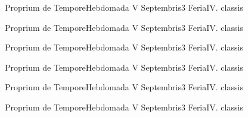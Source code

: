 \documentclass[liber-responsorialis_temporale.tex]{subfiles}
\begin{document}
	{Proprium de Tempore}{Hebdomada V Septembris}{3}{}
	{Feria}{IV. classis}{}
	{}
	{}

	{Proprium de Tempore}{Hebdomada V Septembris}{3}{}
	{Feria}{IV. classis}{}
	{}
	{}

	{Proprium de Tempore}{Hebdomada V Septembris}{3}{}
	{Feria}{IV. classis}{}
	{}
	{}

	{Proprium de Tempore}{Hebdomada V Septembris}{3}{}
	{Feria}{IV. classis}{}
	{}
	{}

	{Proprium de Tempore}{Hebdomada V Septembris}{3}{}
	{Feria}{IV. classis}{}
	{}
	{}

	{Proprium de Tempore}{Hebdomada V Septembris}{3}{}
	{Feria}{IV. classis}{}
	{}
	{}
\end{document}
